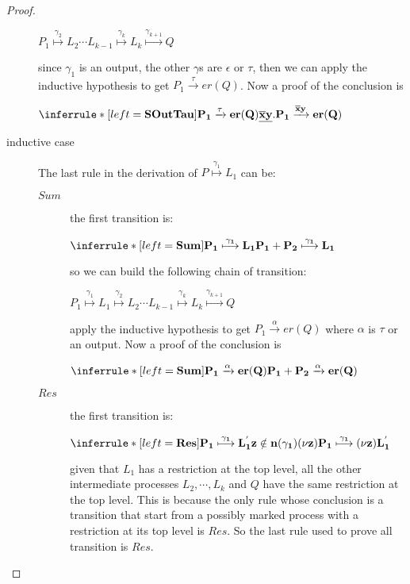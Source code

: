 \begin{proposition}
\begin{proof}
\begin{description}
	    \begin{center}
	      $P_{1} \stackrel{\gamma_{2}}{\longmapsto} L_{2} \cdots L_{k-1} \stackrel{\gamma_{k}}{\longmapsto} L_{k} \stackrel{\gamma_{k+1}}{\longmapsto} Q$ 
	    \end{center}
	    since $\gamma_{1}$ is an output, the other $\gamma$s are $\epsilon$ or $\tau$, then we can apply the inductive hypothesis to get $P_{1} \xrightarrow{\tau} er(Q)$. Now a proof of the conclusion is
	    \begin{center}
	    $\inferrule* [left=\bf{SOutTau}]{
	      P_{1} \xrightarrow{\tau} er(Q)
	    }{
	      \underline{\overline{x}y}.P_{1} \xrightarrow{\overline{x}y} er(Q)
	    }$
	    \end{center}
      \item[inductive case]
	The last rule in the derivation of $P \stackrel{\gamma_{1}}{\longmapsto} L_{1}$ can be:
	\begin{description}
	  \item[$Sum$] the first transition is:
	    \begin{center}
		  $\inferrule* [left=\bf{Sum}]{
		      P_{1} \stackrel{\gamma_{1}}{\longmapsto} L_{1}
		    }{
		      P_{1}+P_{2} \stackrel{\gamma_{1}}{\longmapsto} L_{1}
		  }$ 
	    \end{center}
	    so we can build the following chain of transition:
	    \begin{center}
	      $P_{1} \stackrel{\gamma_{1}}{\longmapsto} L_{1} \stackrel{\gamma_{2}}{\longmapsto} L_{2} \cdots L_{k-1} \stackrel{\gamma_{k}}{\longmapsto} L_{k} \stackrel{\gamma_{k+1}}{\longmapsto} Q$ 
	    \end{center}
	    apply the inductive hypothesis to get $P_{1} \xrightarrow{\alpha} er(Q)$ where $\alpha$ is $\tau$ or an output. Now a proof of the conclusion is
	    \begin{center}
	    $\inferrule* [left=\bf{Sum}]{
	      P_{1} \xrightarrow{\alpha} er(Q)
	    }{
	      P_{1}+P_{2} \xrightarrow{\alpha} er(Q)
	    }$
	    \end{center}
	  \item[$Res$] the first transition is:
	    \begin{center}
	      $\inferrule* [left=\bf{Res}]{
		  P_{1} \stackrel{\gamma_{1}}{\longmapsto} L_{1}^{'}
		\\
		  z\notin n(\gamma_{1})
	      }{
		(\nu z) P_{1} \stackrel{\gamma_{1}}{\longmapsto} (\nu z)L_{1}^{'}
	      }$ 
	    \end{center}
	    given that $L_{1}$ has a restriction at the top level, all the other intermediate processes $L_{2}, \cdots, L_{k}$ and $Q$ have the same restriction at the top level. This is because the only rule whose conclusion is a transition that start from a possibly marked process with a restriction at its top level is $Res$. So the last rule used to prove all transition is $Res$.

\end{description}
\end{description}
\end{proof}
\end{proposition}
